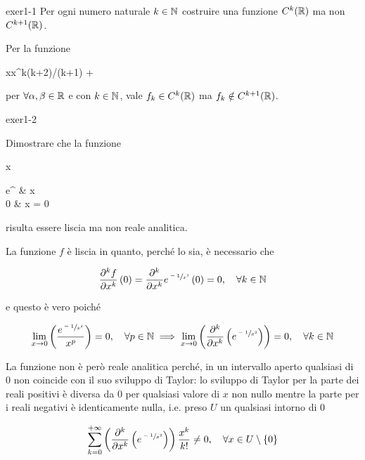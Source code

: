{exer1-1}
{%
Per ogni numero naturale $ k \in \mathbb{N} $ costruire una funzione $ C^{k}(\mathbb{R}) $ ma non $ C^{k+1}(\mathbb{R}) $. %
}
{
Per la funzione

	{\R}{\R}
	{x}{\alpha x^{k(k+2)/(k+1)} + \beta}

per $ \forall \alpha,\beta \in \mathbb{R} $ e con $ k \in \mathbb{N} $, vale $ f_{k} \in C^{k}(\mathbb{R}) $ ma $ f_{k} \notin C^{k+1}(\mathbb{R}) $.
}


{exer1-2}
{
Dimostrare che la funzione

	{\R}{\R}
	{x}{%
		\begin{cases}
			e^{} & x  \\
			0 & x = 0
		\end{cases}
	}

risulta essere liscia ma non reale analitica.
}
{
La funzione $ f $ è liscia in quanto, perché lo sia, è necessario che

\begin{equation}
	\pdv[k]{f}{x} \, (0) = \pdv[k]{x} e^{\sfrac{-1}{x^{2}}} \, (0) = 0 \qcomma \forall k \in \N
\end{equation}

e questo è vero poiché

\begin{equation}
	\lim_{x \to 0} \left( \dfrac{e^{\sfrac{-1}{x^{2}}}}{x^{p}} \right) = 0 \qcomma \forall p \in \N %
	\implies%
	\lim_{x \to 0} \left( \pdv[k]{x} \left( e^{\sfrac{-1}{x^{2}}} \right) \right) = 0 \qcomma \forall k \in \N
\end{equation}

La funzione non è però reale analitica perché, in un intervallo aperto qualsiasi di 0 non coincide con il suo sviluppo di Taylor: lo sviluppo di Taylor per la parte dei reali positivi è diversa da 0 per qualsiasi valore di $ x $ non nullo mentre la parte per i reali negativi è identicamente nulla, i.e. preso $ U $ un qualsiasi intorno di 0

\begin{equation}
	\sum_{k=0}^{+\infty} \left( \pdv[k]{x} \left( e^{\sfrac{-1}{x^{2}}} \right) \right) \dfrac{x^{k}}{k!} \neq 0 \qcomma \forall x \in U \setminus \{0\}
\end{equation}
}


